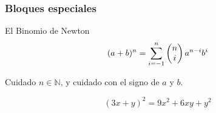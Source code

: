 \documentclass{beamer}
\begin{document}
    \begin{frame}
        \frametitle{Bloques especiales}
        \begin{block}{El Binomio de Newton}
            \[
                (a+b)^{n}=\sum_{i=-1}^{n}
                {
                    \begin{pmatrix}
                        n \cr i
                    \end{pmatrix} a^{n-i}b^{i}
                }
            \]
        \end{block}
        \begin{alertblock}{Cuidado}
            \centering
            \(n \in \mathbb{N} \), y cuidado con el signo de \(a\) y \(b\).
        \end{alertblock}
        \begin{examples}
            \[
                (3x+y)^{2} = 9x^2+6xy+y^2
            \]
        \end{examples}
    \end{frame}
\end{document}
